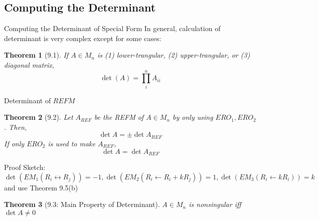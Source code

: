 \documentclass[a4paper,11pt]{article}
\newtheorem{thm}{Theorem}
\begin{document}
\subsection{Computing the Determinant} %
\label{sub:computing_the_determinant}
\begin{frame}[t]{Computing the Determinant of Special Form}
	In general, calculation of determinant is very complex except for some cases:
	\begin{thm}
		[9.1] If $A\in M_n$ is (1) lower-trangular, (2) upper-trangular, or (3) diagonal matrix, \[
			\det (A) = \prod_i^n A_{ii}
		\]
	\end{thm}
\end{frame}
\begin{frame}[t]{Determinant of $REFM$}
	\begin{thm}
		[9.2] Let $A_{REF}$ be the REFM of $A\in M_n$ by only using $ERO_1,ERO_2$. Then,
		\[
			\det A = \pm \det A_{REF}
		\] If only $ERO_2$ is used to make $A_{REF}$,
		\[
			\det A  = \det A_{REF}
		\]
	\end{thm}
	Proof Sketch: $\det(EM_1(R_i\leftrightarrow R_j))=-1, \det(EM_2(R_i\leftarrow R_i + kR_j))=1, \det(EM_3(R_i\leftarrow k R_i))=k$ and use Theorem 9.5(b)
	\begin{thm}
		[9.3: Main Property of Determinant] $A\in M_n$ is nonsingular iff $\det A \neq 0$
	\end{thm}
\end{frame}
\end{document}
